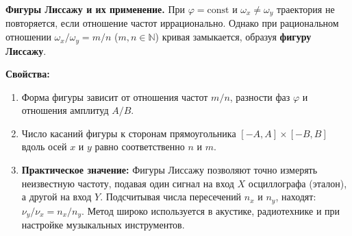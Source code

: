 \begin{remark}
\textbf{Фигуры Лиссажу и их применение.} При $\varphi = \text{const}$ и $\omega_x \neq \omega_y$ траектория не повторяется, если отношение частот иррационально. Однако при рациональном отношении $\omega_x / \omega_y = m/n$ ($m, n \in \mathbb{N}$) кривая замыкается, образуя \textbf{фигуру Лиссажу}.
\par\noindent\textbf{Свойства:}
\begin{enumerate}
    \item Форма фигуры зависит от отношения частот $m/n$, разности фаз $\varphi$ и отношения амплитуд $A/B$.
    \item Число касаний фигуры к сторонам прямоугольника $[-A, A] \times [-B, B]$ вдоль осей $x$ и $y$ равно соответственно $n$ и $m$.
    \item \textbf{Практическое значение:} Фигуры Лиссажу позволяют точно измерять неизвестную частоту, подавая один сигнал на вход $X$ осциллографа (эталон), а другой на вход $Y$. Подсчитывая числа пересечений $n_x$ и $n_y$, находят: $\nu_y / \nu_x = n_x / n_y$. Метод широко используется в акустике, радиотехнике и при настройке музыкальных инструментов.
\end{enumerate}
\end{remark}

\vspace{1cm}

